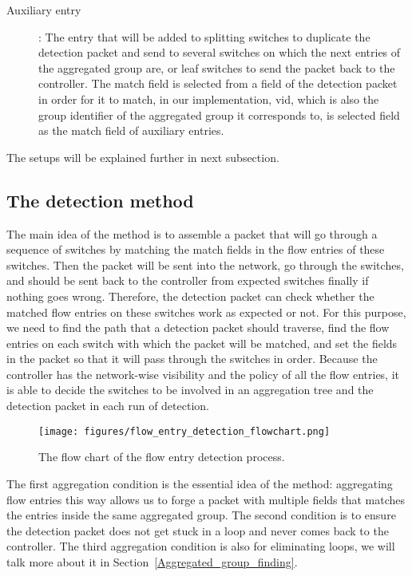 \begin{description}
\item 
[Auxiliary entry]:
The entry that will be added to splitting switches to duplicate the detection packet and send to several  switches on which the next entries of the aggregated group are, or leaf switches to send the packet back to the controller. The match field is selected from a field of the detection packet in order for it to match, in our implementation, vid, which is also the group identifier of the aggregated group it corresponds to, is selected field as the match field of auxiliary entries.
\end{description}

The setups will be explained further in next subsection.

\subsection{The detection method}
\label{Detection_method}

The main idea of the method is to assemble a packet that will go through a sequence of switches by matching the match fields in the flow entries of these switches. Then the packet will be sent into the network, go through the switches, and should be sent back to the controller from expected switches finally if nothing goes wrong. Therefore, the detection packet can check whether the matched flow entries on these switches work as expected or not. For this purpose, we need to find the path that a detection packet should traverse, find the flow entries on each switch with which the packet will be matched, and set the fields in the packet so that it will pass through the switches in order. Because the controller has the network-wise visibility and the policy of all the flow entries, it is able to decide the switches to be involved in an aggregation tree and the detection packet in each run of detection. 

\begin{figure}[H]
\centering
\texttt{[image: figures/flow\_entry\_detection\_flowchart.png]}
\caption{The flow chart of the flow entry detection process.}
\label{flow_entry_detection_flowchart}
\end{figure}

The first aggregation condition is the essential idea of the method: aggregating flow entries this way allows us to forge a packet with multiple fields that matches the entries inside the same aggregated group. The second condition is to ensure the detection packet does not get stuck in a loop and never comes back to the controller. The third aggregation condition is also for eliminating loops, we will talk more about it in Section~\ref{Aggregated_group_finding}.

